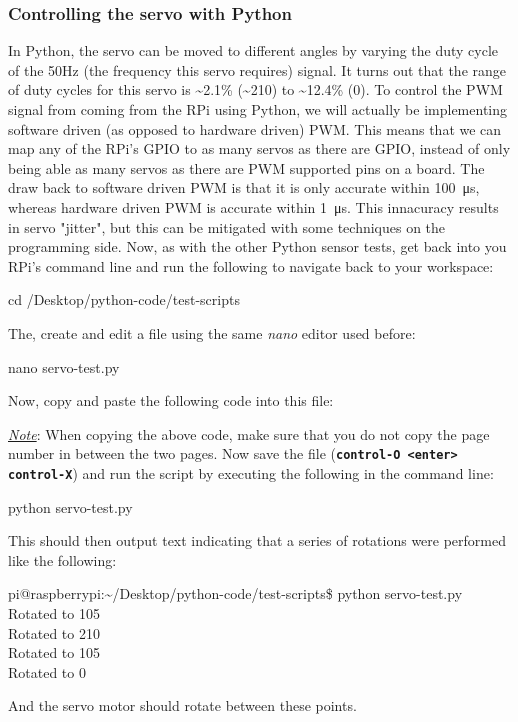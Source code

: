 \documentclass{article}
\newcommand*{\myfont}{\fontfamily{pcr}\selectfont}
\newcommand{\codeb}[2]{
  \begin{tcolorbox}[width=\textwidth,colback={SpringGreen},title={#1},colbacktitle=darkgreen,coltitle=SpringGreen]
    \myfont
    #2
  \end{tcolorbox}
} %
\newcommand{\outputb}[2]{
  \begin{tcolorbox}[width=\textwidth,colback={light-gray},title={#1},colbacktitle=gray,coltitle=light-gray]
    \myfont
    #2
  \end{tcolorbox}
} %
\newcommand{\note}[1]{\underline{\textit{Note}}: #1}
\begin{document}
    \subsubsection{Controlling the servo with Python}
    In Python, the servo can be moved to different angles by varying the duty cycle of the 50Hz (the frequency this servo requires) signal. It turns out that the range of duty cycles for this servo is \textasciitilde2.1\% (\textasciitilde210\degree) to \textasciitilde12.4\% (0\degree). To control the PWM signal from coming from the RPi using Python, we will actually be implementing software driven (as opposed to hardware driven) PWM. This means that we can map any of the RPi's GPIO to as many servos as there are GPIO, instead of only being able as many servos as there are PWM supported pins on a board. The draw back to software driven PWM is that it is only accurate within \SI{100}{\micro\second}, whereas hardware driven PWM is accurate within \SI{1}{\micro\second}. This innacuracy results in servo "jitter", but this can be mitigated with some techniques on the programming side. Now, as with the other Python sensor tests, get back into you RPi's command line and run the following to navigate back to your workspace:
    \codeb{Navigate to your workspace}
    {
      cd  /Desktop/python-code/test-scripts
    }
    The, create and edit a file using the same \textit{nano} editor used before:
    \codeb{Create servo Python testing script file}
    {
      nano servo-test.py
    }
    Now, copy and paste the following code into this file:
     
    \note{When copying the above code, make sure that you do not copy the page number in between the two pages.}
    \newline
    \noindent
    Now save the file (\texttt{\textbf{control-O <enter> control-X}}) and run the script by executing the following in the command line:
    \codeb{Run the test script for the servo motor}
    {
      python servo-test.py
    }
    This should then output text indicating that a series of rotations were performed like the following:
    \outputb{Test script output for servo motor}
    {
      pi@raspberrypi:\textasciitilde/Desktop/python-code/test-scripts\$ python servo-test.py \\
      Rotated to 105\degree                                                        \\
      Rotated to 210\degree                                                        \\
      Rotated to 105\degree                                                        \\
      Rotated to 0\degree
    }
    And the servo motor should rotate between these points.
\end{document}
